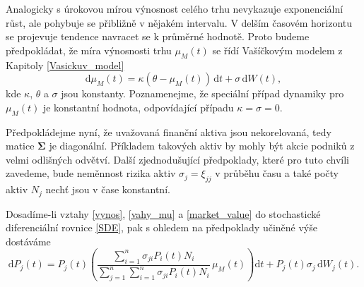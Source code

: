 \documentclass[a4paper,12pt]{report}
\theoremstyle{definition} \newtheorem{definice}[veta]{Definice}
\theoremstyle{remark}
\begin{document}
Analogicky s úrokovou mírou výnosnost celého trhu nevykazuje exponenciální růst, ale pohybuje se přibližně v nějakém intervalu. 
V delším časovém horizontu se projevuje tendence navracet se k průměrné hodnotě.
Proto budeme předpokládat, že míra výnosnosti trhu $\mu_M(t)$ se řídí Vašíčkovým modelem z Kapitoly \ref{Vasickuv_model}
\begin{equation} 
\mathrm{d}\mu_M(t)=\kappa(\theta-\mu_M(t))\,\mathrm{d}t+\sigma\,\mathrm{d}W(t),
\end{equation}
kde $\kappa$, $\theta$ a $\sigma$ jsou konstanty.
Poznamenejme, že speciální případ dynamiky pro $\mu_M(t)$ je konstantní hodnota, odpovídající případu $\kappa=\sigma=0$.

Předpokládejme nyní, že uvažovaná finanční aktiva jsou nekorelovaná, tedy matice $\boldsymbol{\Sigma}$ je diagonální.
Příkladem takových aktiv by mohly být akcie podniků z velmi odlišných odvětví.
Další zjednodušující předpoklady, které pro tuto chvíli zavedeme, bude neměnnost rizika aktiv $\sigma_j=\xi_{jj}$ v průběhu času a také počty aktiv $N_j$ nechť jsou v čase konstantní.

Dosadíme-li vztahy \eqref{vynos}, \eqref{vahy_mu} a \eqref{market_value} do stochastické diferenciální rovnice \eqref{SDE}, pak s ohledem na předpoklady učiněné výše dostáváme
\begin{equation}  \label{SDE_cen_diag}
\mathrm{d}P_j(t)=P_j(t)\left(\frac{\sum\limits_{i=1}^n\sigma_{ji}P_i(t)N_i}{\sum\limits_{j=1}^n\sum\limits_{i=1}^n\sigma_{ji}P_i(t)N_i}\, \mu_M(t)\right)\mathrm{d}t+P_j(t)\sigma_{j}\,\mathrm{d}W_j(t).
\end{equation}
\end{document}
